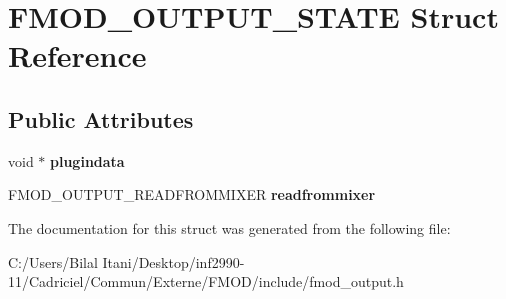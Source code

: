 \hypertarget{struct_f_m_o_d___o_u_t_p_u_t___s_t_a_t_e}{}\section{F\+M\+O\+D\+\_\+\+O\+U\+T\+P\+U\+T\+\_\+\+S\+T\+A\+TE Struct Reference}
\label{struct_f_m_o_d___o_u_t_p_u_t___s_t_a_t_e}
\subsection*{Public Attributes}
\begin{DoxyCompactItemize}
\item 
void $\ast$ {\bfseries plugindata}\hypertarget{struct_f_m_o_d___o_u_t_p_u_t___s_t_a_t_e_a08d52689c8b698c0ea363c7403e8978b}{}\label{struct_f_m_o_d___o_u_t_p_u_t___s_t_a_t_e_a08d52689c8b698c0ea363c7403e8978b}

\item 
F\+M\+O\+D\+\_\+\+O\+U\+T\+P\+U\+T\+\_\+\+R\+E\+A\+D\+F\+R\+O\+M\+M\+I\+X\+ER {\bfseries readfrommixer}\hypertarget{struct_f_m_o_d___o_u_t_p_u_t___s_t_a_t_e_a297cdb7fbba2150340cceecf8d4c9ca1}{}\label{struct_f_m_o_d___o_u_t_p_u_t___s_t_a_t_e_a297cdb7fbba2150340cceecf8d4c9ca1}

\end{DoxyCompactItemize}


The documentation for this struct was generated from the following file\+:\begin{DoxyCompactItemize}
\item 
C\+:/\+Users/\+Bilal Itani/\+Desktop/inf2990-\/11/\+Cadriciel/\+Commun/\+Externe/\+F\+M\+O\+D/include/fmod\+\_\+output.\+h\end{DoxyCompactItemize}

